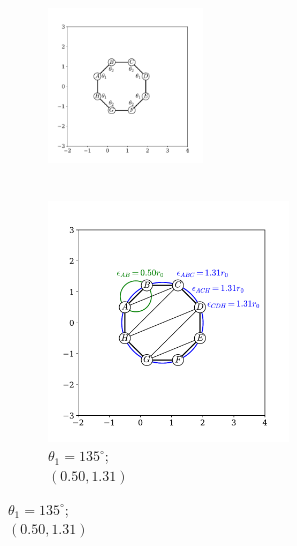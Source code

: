 \begin{figure}[tb]
	\centering
     
      \begin{subfigure}[b]{0.45\textwidth}
         \centering
         \includegraphics[width=0.45\textwidth]{./figures/ph/sl_oct_b3_135x.pdf}
         \caption{\phantom{xxx} \\ \phantom{xxx}}
         \label{fig:b3a}
     \end{subfigure}
     \hfill
     \begin{subfigure}[b]{0.45\textwidth}
         \centering
         \includegraphics[width=0.7\textwidth]{./figures/ph/sl_oct_b3_135.pdf}
         \caption{$\theta_1=135^\circ$; \\$\left(0.50,1.31\right)$}
         \label{fig:b3b}
     \end{subfigure}
     

\end{figure}
